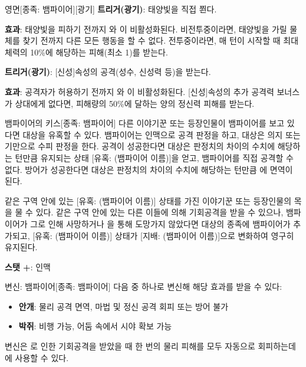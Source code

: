 \documentclass{report}
\begin{document}
	\begin{story}{영면}{[종족: 뱀파이어][광기]}
		\textbf{트리거(광기)}: 태양빛을 직접 쬔다.
		
		\textbf{효과}: 태양빛을 피하기 전까지 와 이 비활성화된다. 비전투중이라면, 태양빛을 가릴 물체를 찾기 전까지 다른 모든 행동을 할 수 없다. 전투중이라면, 매 턴이 시작할 때 최대체력의 10\%에 해당하는 피해(최소 1)를 받는다.
		
		\smallskip
		
		\textbf{트리거(광기)}: [신성]속성의 공격(성수, 신성력 등)을 받는다.
		
		\textbf{효과}: 공격자가 허용하기 전까지 와 이 비활성화된다. [신성]속성의 추가 공격력 보너스가 상대에게 없다면, 피해량의 50\%에 달하는 양의 정신력 피해를 받는다.
		
		\smallskip
		
	\end{story}
	
	\begin{story}{뱀파이어의 키스}{[종족: 뱀파이어]}
		다른 이야기꾼 또는 등장인물이 뱀파이어를 보고 있다면 대상을 유혹할 수 있다. 뱀파이어는 인맥으로 공격 판정을 하고, 대상은 의지 또는 기만으로 수피 판정을 한다. 공격이 성공한다면 대상은 판정치의 차이의 수치에 해당하는 턴만큼 유지되는 상태 [유혹: (뱀파이어 이름)]을 얻고, 뱀파이어를 직접 공격할 수 없다. 방어가 성공한다면 대상은 판정치의 차이의 수치에 해당하는 턴만큼 에 면역이 된다.
		
		\smallskip
		
		같은 구역 안에 있는 [유혹: (뱀파이어 이름)] 상태를 가진 이야기꾼 또는 등장인물의 목을 물 수 있다. 같은 구역 안에 있는 다른 이들에 의해 기회공격을 받을 수 있으나, 뱀파이어가 그로 인해 사망하거나 을 통해 도망가지 않았다면 대상의 종족에 뱀파이어가 추가되고, [유혹: (뱀파이어 이름)] 상태가 [지배: (뱀파이어 이름)]으로 변화하여 영구히 유지된다.
		
		\smallskip
		
		\textbf{스탯 +}: 인맥
		
		\smallskip
		
	\end{story}
	
	\begin{story}{변신: 뱀파이어}{[종족: 뱀파이어]}
		다음 중 하나로 변신해 해당 효과를 받을 수 있다:
		\begin{itemize}
			\item \textbf{안개}: 물리 공격 면역, 마법 및 정신 공격 회피 또는 방어 불가
			\item \textbf{박쥐}: 비행 가능, 어둠 속에서 시야 확보 가능
		\end{itemize}
		
		변신은 로 인한 기회공격을 받았을 때 한 번의 물리 피해를 모두 자동으로 회피하는데에 사용할 수 있다.
		
		\smallskip
		
	\end{story}
	
\end{document}
